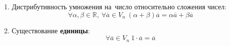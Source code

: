 \begin{enumerate}
	\item Дистрибутивность умножения на~число относительно сложения чисел:
	\begin{equation*}
	\forall \alpha, \beta \in \mathbb R, \ 
	\forall \overline a \in V_n \ 
	(\alpha + \beta) \overline a = \alpha \overline a + \beta \overline a
	\end{equation*}
	
	\item Существование \textbf{единицы}:
	\begin{equation*}
	\forall \overline a \in V_n \ 
	1 \cdot \overline a = \overline a
	\end{equation*}
\end{enumerate}


